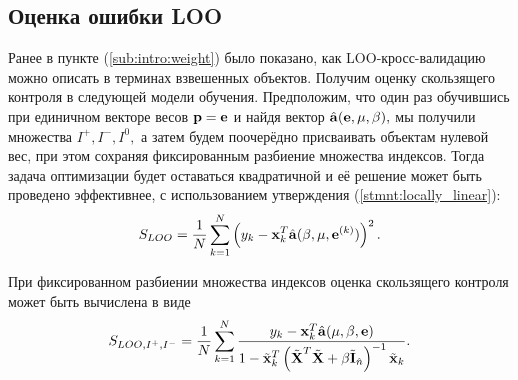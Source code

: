 \subsection{Оценка ошибки LOO}
Ранее в пункте (\ref{sub:intro:weight}) было показано, как LOO-кросс-валидацию можно описать в терминах взвешенных объектов.
Получим оценку скользящего контроля в следующей модели обучения. Предположим, что один раз обучившись при единичном векторе весов $\boldsymbol{\mathbf{p}} = \boldsymbol{\mathbf{e}}$ и найдя вектор $\hat{\boldsymbol{\mathbf{a}}}(\boldsymbol{\mathbf{e}}, {\mu,\beta}),$ мы получили множества $I^+, I^-, I^0,$ а затем будем поочерёдно присваивать объектам нулевой вес, при этом сохраняя фиксированным разбиение множества индексов. Тогда задача оптимизации будет оставаться квадратичной и её решение может быть проведено эффективнее, с использованием утверждения (\ref{stmnt:locally_linear}):
\begin{equation}
	\label{LOO}
	S_{LOO} = \frac1N\sum\limits_{k=1}^N \left(y_k - \boldsymbol{\mathbf{x}}_k^T\hat{\boldsymbol{\mathbf{a}}}(\beta, \mu, \boldsymbol{\mathbf{e}}^{(k)})\right)^2.
\end{equation}




\begin{statement}
\label{stmnt:CVI}
При фиксированном разбиении множества индексов оценка скользящего контроля может быть вычислена в виде
\begin{equation*}
	S_{LOO, I^+, I^-} = \frac1N\sum\limits_{k=1}^N\frac{y_k - \boldsymbol{\mathbf{x}}_k^T\hat{\boldsymbol{\mathbf{a}}}({\mu,\beta}, \boldsymbol{\mathbf{e}})}{1 - \tilde{\boldsymbol{\mathbf{x}}}_k^T\left(\tilde{\boldsymbol{\mathbf{X}}}^T\tilde{\boldsymbol{\mathbf{X}}} + \beta \tilde{\boldsymbol{\mathbf{I}}}_{\hat n}\right)^{-1}\tilde{\boldsymbol{\mathbf{x}}}_k}.
\end{equation*}
\end{statement}

